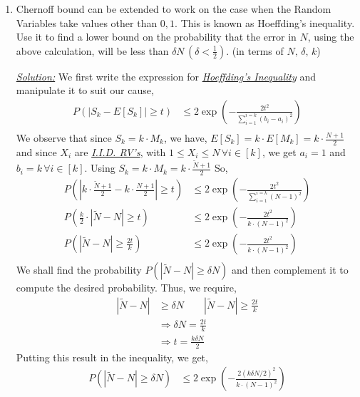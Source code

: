 \documentclass[12pt,titlepage]{report}
\begin{document}
\begin{enumerate}[label=(\alph*)]
    \item Chernoff bound can be extended to work on the case when the Random Variables take values other than ${0, 1}$. This is known as Hoeffding’s inequality. Use it to find a lower bound on the probability that the error in $N$, using the above calculation, will be less than $\delta N\,(\delta < \frac{1}{2})$. (in terms of $N,\, \delta,\, k$)
    \item[\underline{\textit{Solution:}}] We first write the expression for \href{https://en.wikipedia.org/wiki/Hoeffding\%27s_inequality#Statement}{\textit{\color{Cerulean} Hoeffding's Inequality}} and manipulate it to suit our cause,
    \begin{align*}
        P(|S_k-E[S_k]|\geq t)&\leq 2\exp{\left(-\frac{2t^2}{\sum_{i=1}^{i=k} (b_i-a_i)^2}\right)}\\
    \end{align*}
    We observe that since $S_k=k\cdot M_k$, we have, $E[S_k]=k\cdot E[M_k]=k\cdot\frac{N+1}{2}$ and since $X_i$ are \href{https://en.wikipedia.org/wiki/Independent_and_identically_distributed_random_variables}{\color{Cerulean} \textit{I.I.D. RV's}}, with $1\leq X_i\leq N\,\forall i\in [k]$, we get $a_i=1$ and $b_i=k\, \forall i\in[k]$. Using $S_k=k\cdot M_k=k\cdot \frac{\widetilde{N}+1}{2}$ So,
    \begin{align*}
        P\left(|k\cdot \frac{\widetilde{N}+1}{2}-k\cdot \frac{N+1}{2}|\geq t\right)&\leq 2\exp{\left(-\frac{2t^2}{\sum_{i=1}^{i=k} (N-1)^2}\right)}\\
        P\left(\frac{k}{2}\cdot|\widetilde{N}-N|\geq t\right)&\leq 2\exp{\left(-\frac{2t^2}{k\cdot(N-1)^2}\right)}\\
        P\left(|\widetilde{N}-N|\geq \frac{2t}{k}\right)&\leq 2\exp{\left(-\frac{2t^2}{k\cdot(N-1)^2}\right)}\\
    \end{align*}
    We shall find the probability $P(|\widetilde{N}-N|\geq \delta N)$ and then complement it to compute the desired probability. Thus, we require,
    \begin{align*}
        |\widetilde{N}-N|&\geq \delta N \qquad |\widetilde{N}-N|\geq \frac{2t}{k}\\
        &\Rightarrow \delta N=\frac{2t}{k}\\
        &\Rightarrow \boxed{t=\frac{k\delta N}{2}}
    \end{align*}
    Putting this result in the inequality, we get,
    \begin{align*}
        P(|\widetilde{N}-N|\geq \delta N) &\leq 2\exp{\left(-\frac{2(k\delta N/2)^2}{k\cdot(N-1)^2}\right)}\\

\end{align*}
\end{enumerate}
\end{document}
